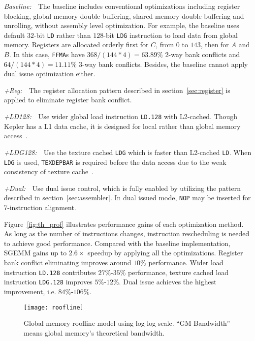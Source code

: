{\it Baseline:}~~The baseline includes conventional optimizations including register blocking, global
memory double buffering, shared memory double buffering and unrolling, without assembly level optimization.
For example, the baseline uses default $32$-bit {\tt LD} rather than $128$-bit {\tt LDG} instruction to load data from global memory.
Registers are allocated orderly first for $C$, from $0$ to $143$, then for $A$ and $B$. 
In this case, {\tt FFMA}s have $368/(144*4)=63.89\%$ 2-way bank conflicts and $64/(144*4)=11.11\%$ 3-way bank conflicts. 
Besides, the baseline cannot apply dual issue optimization either.

{\it +Reg:}~~The register allocation pattern described in section~\ref{sec:register} is applied to eliminate register bank conflict. 

{\it +LD128:}~~Use wider global load instruction {\tt LD.128} with L2-cached.
Though Kepler has a L1 data cache, it is designed for local rather than global memory access~\cite{gk110}.

{\it +LDG128:}~~Use the texture cached {\tt LDG} which is faster than L2-cached {\tt LD}. 
When {\tt LDG} is used, {\tt TEXDEPBAR} is required before the data access due to the weak consistency of texture cache~\cite{lukyanov2014efficient}.

{\it +Dual:}~~Use dual issue control, which is fully enabled by utilizing the pattern described in section~\ref{sec:assembler}.
In dual issued mode, {\tt NOP} may be inserted for 7-instruction alignment.

Figure~\ref{fig:th_prof} illustrates performance gains of each optimization method.
As long as the number of instructions changes, instruction rescheduling is needed to achieve good performance.
Compared with the baseline implementation, SGEMM gains up to $2.6\times$ speedup by applying all the optimizations.
Register bank conflict eliminating improves around $10\%$ performance. 
Wider load instruction {\tt LD.128} contributes $27\%$-$35\%$ performance, texture cached
load instruction {\tt LDG.128} improves $5\%$-$12\%$.
Dual issue achieves the highest improvement, i.e. $84\%$-$106\%$.


\begin{figure}[htbp]
\begin{center}
\texttt{[image: roofline]}
    \caption{Global memory roofline model using log-log scale. ``GM Bandwidth'' means global memory's theoretical
    bandwidth.} %
\label{fig:roofline_global}
\end{center}
\end{figure}


